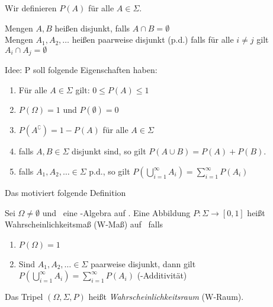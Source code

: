 Wir definieren $P(A)$ für alle $A \in \Sigma$.
\begin{definition}
    Mengen $A, B$ heißen disjunkt, falls $A\cap B = \emptyset$\\
    Mengen $A_1, A_2, \dots$ heißen paarweise disjunkt (p.d.) falls für alle $i \neq j$ gilt
    $A_i \cap A_j = \emptyset$
\end{definition}

Idee: P soll folgende Eigenschaften haben:
\begin{enumerate}
    \item Für alle $A\in \Sigma$ gilt: $0 \leq P(A)\leq 1$
    \item $P(\Omega) = 1$ und $P(\emptyset) = 0$
    \item $P(A^\complement) = 1-P(A)$ für alle $A\in \Sigma$
    \item falls $A,B\in\Sigma$ disjunkt sind, so gilt
        $P(A\cup B) = P(A) + P(B)$.
    \item falls $A_1, A_2,\dots \in \Sigma$ p.d., so gilt
        $P(\bigcup\limits_{i=1}^\infty A_i) = \sum_{i=1}^\infty P(A_i)$
\end{enumerate}

Das motiviert folgende Definition

\begin{definition}[Wahrscheinlichkeitsmaß]
    Sei $\Omega \neq \emptyset$ und \tS\ eine \ts-Algebra auf \tO.
    Eine Abbildung $P: \Sigma \to [0,1]$ heißt Wahrscheinlichkeitsmaß (W-Maß) auf \tS\ falls
    \begin{enumerate}
        \item $P(\Omega) = 1$
        \item Sind $A_1, A_2,\dots \in \Sigma$ paarweise disjunkt, dann gilt
            $P\left(\bigcup_{i=1}^\infty A_i\right) = \sum_{i=1}^\infty P(A_i)$
            (\ts-Additivität)
    \end{enumerate}
\end{definition}
\noindent
Das Tripel $\left( \Omega, \Sigma, P\right)$ heißt \emph{Wahrscheinlichkeitsraum} (W-Raum).
